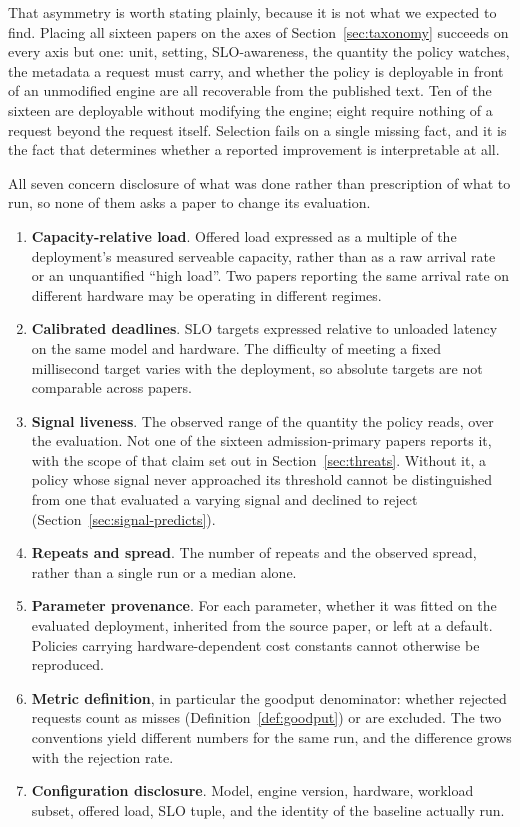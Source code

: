 That asymmetry is worth stating plainly, because it is not what we
expected to find. Placing all sixteen papers on the axes of
Section~\ref{sec:taxonomy} succeeds on every axis but one: unit,
setting, SLO-awareness, the quantity the policy watches, the metadata a
request must carry, and whether the policy is deployable in front of an
unmodified engine are all recoverable from the published text. Ten of
the sixteen are deployable without modifying the engine; eight require
nothing of a request beyond the request itself. Selection fails on a
single missing fact, and it is the fact that determines whether a
reported improvement is interpretable at all.

All seven concern disclosure of what was done rather than prescription
of what to run, so none of them asks a paper to change its evaluation.

\begin{enumerate}[leftmargin=1.5em, itemsep=2pt]
\item \textbf{Capacity-relative load}. Offered load expressed as a
      multiple of the deployment's measured serveable capacity, rather
      than as a raw arrival rate or an unquantified ``high load''. Two
      papers reporting the same arrival rate on different hardware may
      be operating in different regimes.
\item \textbf{Calibrated deadlines}. SLO targets expressed relative to
      unloaded latency on the same model and hardware. The difficulty
      of meeting a fixed millisecond target varies with the deployment,
      so absolute targets are not comparable across papers.
\item \textbf{Signal liveness}. The observed range of the quantity the
      policy reads, over the evaluation. Not one of the sixteen
      admission-primary papers reports it, with the scope of that
      claim set out in Section~\ref{sec:threats}. Without it, a policy
      whose signal never approached its
      threshold cannot be distinguished from one that evaluated a
      varying signal and declined to reject
      (Section~\ref{sec:signal-predicts}).
\item \textbf{Repeats and spread}. The number of repeats and the
      observed spread, rather than a single run or a median alone.
\item \textbf{Parameter provenance}. For each parameter, whether it was
      fitted on the evaluated deployment, inherited from the source
      paper, or left at a default. Policies carrying hardware-dependent
      cost constants cannot otherwise be reproduced.
\item \textbf{Metric definition}, in particular the goodput
      denominator: whether rejected requests count as misses
      (Definition~\ref{def:goodput}) or are excluded. The two
      conventions yield different numbers for the same run, and the
      difference grows with the rejection rate.
\item \textbf{Configuration disclosure}. Model, engine version,
      hardware, workload subset, offered load, SLO tuple, and the
      identity of the baseline actually run.
\end{enumerate}

